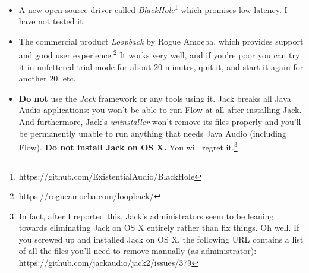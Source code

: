 \documentclass{article}
\newcommand\name{Flow}
\begin{document}
\begin{itemize}
\begin{itemize}
{\begin{enumerate}
\item Unpack the {\tt Soundflower-2.0b2.dmg} disk image.
\item In the terminal, type:
\begin{tabbing}
~\hspace{5em}{\tt cd /Volumes/Soundflower-2.0b2}\hspace{2in}\= {\it Then press RETURN}\\
~\hspace{5em}{\tt sudo installer -pkg Soundflower.pkg -target /}
\end{tabbing}
\item Enter your password and press RETURN.
\item When you're told that this has failed, go to ``Security and Privacy'' in System Preferences, and permit the software to load.  You may need to click "Allow...", then select ``MATT INGALLS'' (the developer) in the list and approve it.  Then do steps 2 and 3 again.
\item Wait a long time.  It takes quite a while to install for no good reason.
\item At this point, SoundFlower 2ch and 64ch will appear as audio devices.  You want SoundFlower 2ch.  You can configure it further in Audio MIDI Setup if you like, or just use it straight.
\end{enumerate}
}
which works well though with high latency.  
\item A new open-source driver called {\it BlackHole}\footnote{https:/\!/github.com/ExistentialAudio/BlackHole} which promises low latency.  I have not tested it.
\item The commercial product {\it Loopback} by Rogue Amoeba, which provides support and good user experience.\footnote{https:/\!/rogueamoeba.com/loopback/}  It works very well, and if you're poor you can try it in unfettered trial mode for about 20 minutes, quit it, and start it again for another 20, etc.   
\item {\bf Do not} use the {\it Jack} framework or any tools using it.  Jack breaks all Java Audio applications: you won't be able to run {\name} at all after installing Jack.  And furthermore, Jack's {\it uninstaller} won't remove its files properly and you'll be permanently unable to run anything that needs Java Audio (including {\name}).  {\color{red}\bf Do not install Jack on OS X.}  You will regret it.\footnote{In fact, after I reported this, Jack's administrators seem to be leaning towards eliminating Jack on OS X entirely rather than fix things.  Oh well.  If you screwed up and installed Jack on OS X, the following URL contains a list of all the files you'll need to remove manually (as administrator): https:/\!/github.com/jackaudio/jack2/issues/379}
\end{itemize}
\end{itemize}
\end{document}
